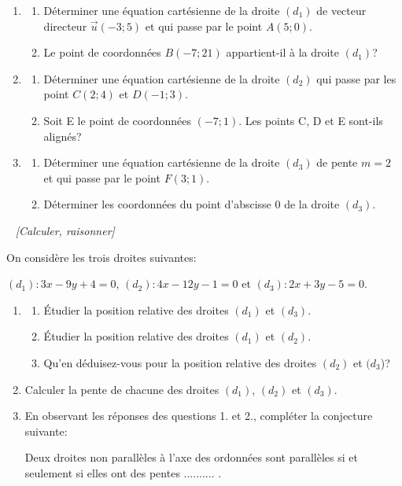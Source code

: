 \begin{enumerate}
\item \begin{enumerate}[label=\alph*)]
\item Déterminer une équation cartésienne de la droite $(d_1)$ de vecteur directeur $\vec{u}(-3;5)$ et qui passe par le point $A(5;0)$.
\item Le point de coordonnées $B(-7;21)$ appartient-il à la droite $(d_1)$?
\end{enumerate}
\item \begin{enumerate}[label=\alph*)]
\item Déterminer une équation cartésienne de la droite $(d_2)$  qui passe par les point $C(2;4)$ et $D(-1;3)$.
\item Soit E le point de coordonnées $(-7;1)$. Les points C, D et E sont-ils alignés?
\end{enumerate}
\item \begin{enumerate}[label=\alph*)]
\item Déterminer une équation cartésienne de la droite $(d_3)$  de pente $m=2$ et qui passe par le point $F(3;1)$.
\item Déterminer les coordonnées du point d'abscisse $0$ de la droite $(d_3)$.
\end{enumerate}
\end{enumerate}


\exo~ \textit{[Calculer, raisonner]}

On considère les trois droites suivantes:

 $(d_1): 3x-9y+4=0$, $(d_2): 4x-12y-1=0$ et $(d_3): 2x+3y-5=0$. 


\begin{enumerate}
\item \begin{enumerate}[label=\alph*)]
\item Étudier la position relative des droites $(d_1)$ et $(d_3)$.
\item Étudier la position relative des droites $(d_1)$ et $(d_2)$.
\item Qu'en déduisez-vous pour la position relative des droites $(d_2)$ et $(d_3$)?
\end{enumerate}
\item Calculer la pente de chacune des droites $(d_1)$, $(d_2)$ et $(d_3)$.
\item En observant les réponses des questions 1. et 2., compléter la conjecture suivante:

\og Deux droites non parallèles à l'axe des ordonnées sont parallèles si et seulement si elles ont des pentes .......... \fg{} .
\end{enumerate}

